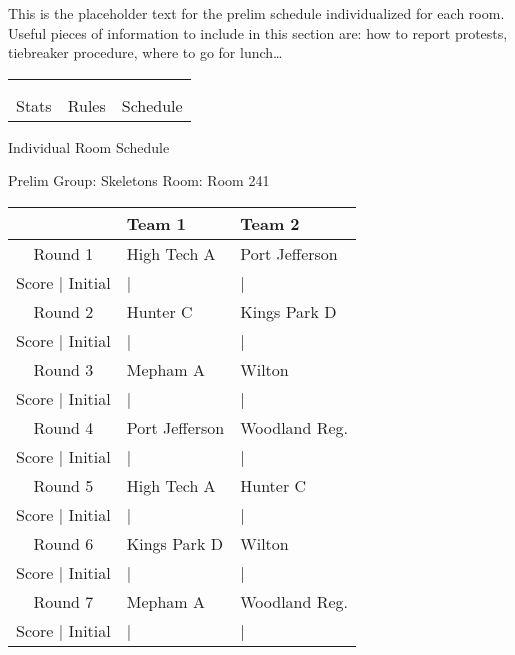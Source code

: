 \documentclass{article}%
\begin{document}
\vspace*{16pt}%
\linebreak%
This is the placeholder text for the prelim schedule individualized for each room. Useful pieces of information to include in this section are: how to report protests, tiebreaker procedure, where to go for lunch…%
\vspace*{30pt}%
\newline%
%
\begin{tabularx}{\textwidth}{YYY}%
  &  &  \\%
\\%
Stats&Rules&Schedule\\%
\end{tabularx}%
\newpage%
\begin{center}%
\begin{Huge}%
Individual Room Schedule%
\end{Huge}%
\vspace*{16pt}%
\linebreak%
\begin{Large}%
Prelim Group: Skeletons \hfill Room: Room 241%
\end{Large}%
\end{center}%
%
\begin{tabularx}{\textwidth}{|c|Y|Y|}%
\hline%
&Team 1&Team 2\\%
\hline%
Round 1&High Tech A&Port Jefferson\\%
\hline%
Score | Initial&|&|\\%
\hline%
Round 2&Hunter C&Kings Park D\\%
\hline%
Score | Initial&|&|\\%
\hline%
Round 3&Mepham A&Wilton\\%
\hline%
Score | Initial&|&|\\%
\hline%
Round 4&Port Jefferson&Woodland Reg.\\%
\hline%
Score | Initial&|&|\\%
\hline%
Round 5&High Tech A&Hunter C\\%
\hline%
Score | Initial&|&|\\%
\hline%
Round 6&Kings Park D&Wilton\\%
\hline%
Score | Initial&|&|\\%
\hline%
Round 7&Mepham A&Woodland Reg.\\%
\hline%
Score | Initial&|&|\\%
\hline%
\end{tabularx}%
\end{document}
